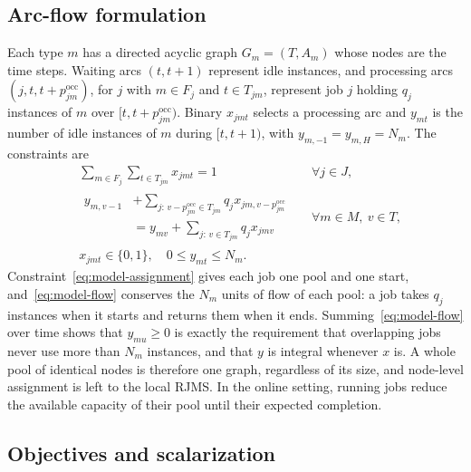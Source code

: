 \documentclass[conference]{IEEEtran}
\begin{document}
\subsection{Arc-flow formulation}

Each type $m$ has a directed acyclic graph $G_m=(T,A_m)$ whose nodes are the time steps. Waiting arcs $(t,t+1)$ represent idle instances, and processing arcs $(j,t,t+p_{jm}^{\mathrm{occ}})$, for $j$ with $m\in F_j$ and $t\in T_{jm}$, represent job $j$ holding $q_j$ instances of $m$ over $[t,t+p_{jm}^{\mathrm{occ}})$. Binary $x_{jmt}$ selects a processing arc and $y_{mt}$ is the number of idle instances of $m$ during $[t,t+1)$, with $y_{m,-1}=y_{m,H}=N_m$. The constraints are
\begin{align}
&\textstyle\sum_{m\in F_j}\sum_{t\in T_{jm}}x_{jmt}=1 && \forall j\in J, \label{eq:model-assignment}\\
&\begin{aligned}
y_{m,v-1}&+\textstyle\sum_{j:\,v-p_{jm}^{\mathrm{occ}}\in T_{jm}} q_j x_{jm,v-p_{jm}^{\mathrm{occ}}}\\
&=y_{mv}+\textstyle\sum_{j:\,v\in T_{jm}} q_j x_{jmv}
\end{aligned} && \forall m\in M,\ v\in T, \label{eq:model-flow}\\
&x_{jmt}\in\{0,1\},\quad 0\leq y_{mt}\leq N_m. \nonumber
\end{align}
Constraint~\eqref{eq:model-assignment} gives each job one pool and one start, and~\eqref{eq:model-flow} conserves the $N_m$ units of flow of each pool: a job takes $q_j$ instances when it starts and returns them when it ends. Summing~\eqref{eq:model-flow} over time shows that $y_{mu}\geq0$ is exactly the requirement that overlapping jobs never use more than $N_m$ instances, and that $y$ is integral whenever $x$ is. A whole pool of identical nodes is therefore one graph, regardless of its size, and node-level assignment is left to the local RJMS. In the online setting, running jobs reduce the available capacity of their pool until their expected completion.

\subsection{Objectives and scalarization}
\end{document}
